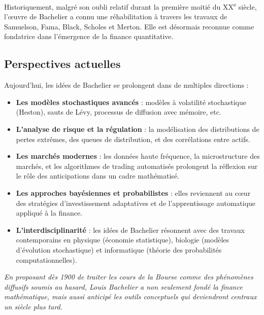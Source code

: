 \documentclass[12pt,a4paper]{article}
\begin{document}
Historiquement, malgré son oubli relatif durant la première moitié du XX\textsuperscript{e} siècle, l’œuvre de Bachelier a connu une réhabilitation à travers les travaux de Samuelson, Fama, Black, Scholes et Merton. Elle est désormais reconnue comme fondatrice dans l’émergence de la finance quantitative.

\subsection{Perspectives actuelles}

Aujourd’hui, les idées de Bachelier se prolongent dans de multiples directions :

\begin{itemize}
    \item \textbf{Les modèles stochastiques avancés} : modèles à volatilité stochastique (Heston), sauts de Lévy, processus de diffusion avec mémoire, etc.

    \item \textbf{L’analyse de risque et la régulation} : la modélisation des distributions de pertes extrêmes, des queues de distribution, et des corrélations entre actifs.

    \item \textbf{Les marchés modernes} : les données haute fréquence, la microstructure des marchés, et les algorithmes de trading automatisés prolongent la réflexion sur le rôle des anticipations dans un cadre mathématisé.

    \item \textbf{Les approches bayésiennes et probabilistes} : elles reviennent au cœur des stratégies d’investissement adaptatives et de l’apprentissage automatique appliqué à la finance.

    \item \textbf{L’interdisciplinarité} : les idées de Bachelier résonnent avec des travaux contemporains en physique (économie statistique), biologie (modèles d’évolution stochastique) et informatique (théorie des probabilités computationnelles).
\end{itemize}

\begin{center}
\emph{En proposant dès 1900 de traiter les cours de la Bourse comme des phénomènes diffusifs soumis au hasard, Louis Bachelier a non seulement fondé la finance mathématique, mais aussi anticipé les outils conceptuels qui deviendront centraux un siècle plus tard.}
\end{center}
\end{document}
